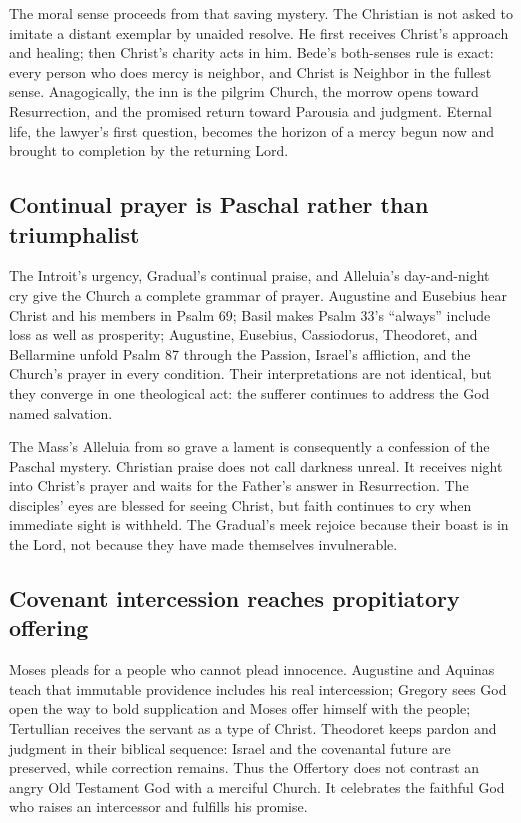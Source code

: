 The moral sense proceeds from that saving mystery. The Christian is not asked
to imitate a distant exemplar by unaided resolve. He first receives Christ's
approach and healing; then Christ's charity acts in him. Bede's both-senses
rule is exact: every person who does mercy is neighbor, and Christ is Neighbor
in the fullest sense. Anagogically, the inn is the pilgrim Church, the morrow
opens toward Resurrection, and the promised return toward Parousia and
judgment. Eternal life, the lawyer's first question, becomes the horizon of a
mercy begun now and brought to completion by the returning Lord.

\subsection*{Continual prayer is Paschal rather than triumphalist}

The Introit's urgency, Gradual's continual praise, and Alleluia's day-and-night
cry give the Church a complete grammar of prayer. Augustine and Eusebius hear
Christ and his members in Psalm 69; Basil makes Psalm 33's ``always'' include
loss as well as prosperity; Augustine, Eusebius, Cassiodorus, Theodoret, and
Bellarmine unfold Psalm 87 through the Passion, Israel's affliction, and the
Church's prayer in every condition. Their interpretations are not identical,
but they converge in one theological act: the sufferer continues to address
the God named salvation.

The Mass's Alleluia from so grave a lament is consequently a confession of the
Paschal mystery. Christian praise does not call darkness unreal. It receives
night into Christ's prayer and waits for the Father's answer in Resurrection.
The disciples' eyes are blessed for seeing Christ, but faith continues to cry
when immediate sight is withheld. The Gradual's meek rejoice because their
boast is in the Lord, not because they have made themselves invulnerable.

\subsection*{Covenant intercession reaches propitiatory offering}

Moses pleads for a people who cannot plead innocence. Augustine and Aquinas
teach that immutable providence includes his real intercession; Gregory sees
God open the way to bold supplication and Moses offer himself with the people;
Tertullian receives the servant as a type of Christ. Theodoret keeps pardon
and judgment in their biblical sequence: Israel and the covenantal future are
preserved, while correction remains. Thus the Offertory does not contrast an
angry Old Testament God with a merciful Church. It celebrates the faithful God
who raises an intercessor and fulfills his promise.

